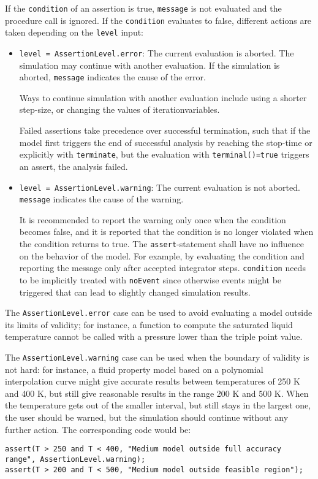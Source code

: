 If the \lstinline!condition! of an assertion is true, \lstinline!message! is not evaluated and the procedure call is ignored.
If the \lstinline!condition! evaluates to false, different actions are taken depending on the \lstinline!level! input:
\begin{itemize}
\item
  \lstinline!level = AssertionLevel.error!:
  The current evaluation is aborted.
  The simulation may continue with another evaluation.
  If the simulation is aborted, \lstinline!message! indicates the cause of the error.
  \begin{nonnormative}
  Ways to continue simulation with another evaluation include using a shorter step-size, or changing the values of iterationvariables.
  \end{nonnormative}
  Failed assertions take precedence over successful termination, such that if the model first triggers the end of successful analysis by reaching the stop-time or explicitly with \lstinline!terminate!, but the evaluation with \lstinline!terminal()=true! triggers an assert, the analysis failed.
\item
  \lstinline!level = AssertionLevel.warning!:
  The current evaluation is not aborted.
  \lstinline!message! indicates the cause of the warning.
  \begin{nonnormative}
  It is recommended to report the warning only once when the condition becomes false, and it is reported that the condition is no longer violated when the condition returns to true.
  The \lstinline!assert!-statement shall have no influence on the behavior of the model.
  For example, by evaluating the condition and reporting the message only after accepted integrator steps.
  \lstinline!condition! needs to be implicitly treated with \lstinline!noEvent! since otherwise events might be triggered that can lead to slightly changed simulation results.
  \end{nonnormative}
\end{itemize}

\begin{nonnormative}
The \lstinline!AssertionLevel.error! case can be used to avoid evaluating a model outside its limits of validity; for instance, a function to compute the saturated liquid temperature cannot be called with a pressure lower than the triple point value.

The \lstinline!AssertionLevel.warning! case can be used when the boundary of validity is not hard: for instance, a fluid property model based on a polynomial interpolation curve might give accurate results between temperatures of 250 K and 400 K, but still give reasonable results in the range 200 K and 500 K.
When the temperature gets out of the smaller interval, but still stays in the largest one, the user should be warned, but the simulation should continue without any further action.
The corresponding code would be:
\begin{lstlisting}[language=modelica]
assert(T > 250 and T < 400, "Medium model outside full accuracy range", AssertionLevel.warning);
assert(T > 200 and T < 500, "Medium model outside feasible region");
\end{lstlisting}
\end{nonnormative}

